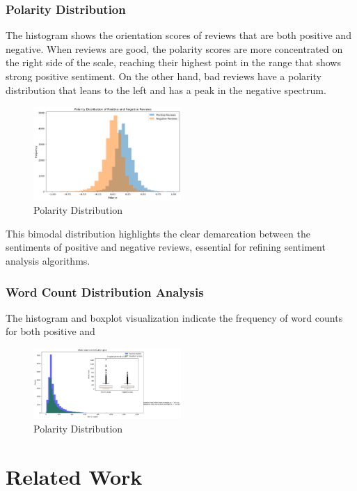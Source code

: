 \documentclass[11pt,a4paper]{article}
\begin{document}
\subsubsection{Polarity Distribution}
The histogram shows the orientation scores of reviews that are both positive and negative. When reviews are good, the polarity scores are more concentrated on the right side of the scale, reaching their highest point in the range that shows strong positive sentiment. On the other hand, bad reviews have a polarity distribution that leans to the left and has a peak in the negative spectrum. 
\begin{figure}[ht]
    \centering
    \includegraphics[width=0.5\textwidth]{1.png}
    \caption{Polarity Distribution}
    \label{fig:polarity_distribution}
\end{figure}


This bimodal distribution highlights the clear demarcation between the sentiments of positive and negative reviews, essential for refining sentiment analysis algorithms.

\subsubsection{Word Count Distribution Analysis}
The histogram and boxplot visualization indicate the frequency of word counts for both positive and
\begin{figure}[ht]
    \centering
    \includegraphics[width=0.5\textwidth]{2.png}
    \caption{Polarity Distribution}
    \label{fig:polarity_distribution}
\end{figure}


\section{Related Work}
\end{document}
